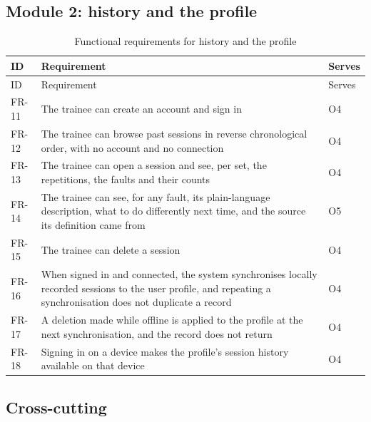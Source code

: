 \subsection{Module 2: history and the profile}
\label{sec:3.3.2}

{\small
\setlength{\LTpre}{6pt}\setlength{\LTpost}{8pt}
\begin{longtable}{>{\raggedright\arraybackslash}p{}>{\raggedright\arraybackslash}p{}>{\raggedright\arraybackslash}p{}}
\caption{Functional requirements for history and the profile}\\
\toprule
ID & Requirement & Serves \\
\midrule
\endfirsthead
\toprule
ID & Requirement & Serves \\
\midrule
\endhead
\bottomrule
\endfoot
\bottomrule
\endlastfoot
FR-11 & The trainee can create an account and sign in & O4 \\
FR-12 & The trainee can browse past sessions in reverse chronological order, with no account and no connection & O4 \\
FR-13 & The trainee can open a session and see, per set, the repetitions, the faults and their counts & O4 \\
FR-14 & The trainee can see, for any fault, its plain-language description, what to do differently next time, and the source its definition came from & O5 \\
FR-15 & The trainee can delete a session & O4 \\
FR-16 & When signed in and connected, the system synchronises locally recorded sessions to the user profile, and repeating a synchronisation does not duplicate a record & O4 \\
FR-17 & A deletion made while offline is applied to the profile at the next synchronisation, and the record does not return & O4 \\
FR-18 & Signing in on a device makes the profile's session history available on that device & O4 \\
\end{longtable}
}

\subsection{Cross-cutting}
\label{sec:3.3.3}

